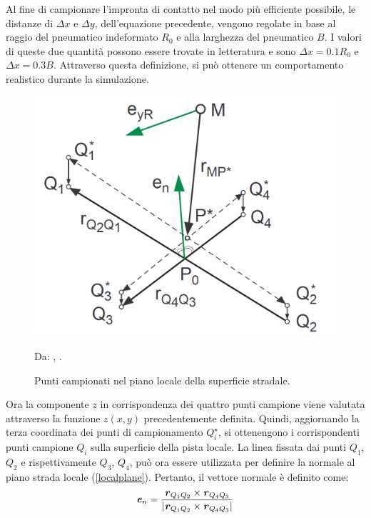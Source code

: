 %
Al fine di campionare l'impronta di contatto nel modo più efficiente possibile, le distanze di $\Delta x$ e $\Delta y$, dell'equazione precedente, vengono regolate in base al raggio del pneumatico indeformato $R_0$ e alla larghezza del pneumatico $B$. I valori di queste due quantità possono essere trovate in letteratura e sono $\Delta x = 0.1 R_0$ e $\Delta x = 0.3 B$. Attraverso questa definizione, si può ottenere un comportamento realistico durante la simulazione.

\begin{figure}[h]
	\centering
	\includegraphics[width=0.5\linewidth]{Figures/local_track}
	\caption{Punti campionati nel piano locale della superficie stradale.}
	Da: \citeauthor{Rill}, .
	\label{localtrack}
\end{figure}
%
\noindent
Ora la componente $z$ in corrispondenza dei quattro punti campione viene valutata attraverso la funzione $z(x,y)$ precedentemente definita. Quindi, aggiornando la terza coordinata dei punti di campionamento $Q^\star_i$, si ottenengono i corrispondenti punti campione $Q_i$ sulla superficie della pista locale. La linea fissata dai punti $Q_1$, $Q_2$ e rispettivamente $Q_3$, $Q_4$, può ora essere utilizzata per definire la normale al piano strada locale (\figurename \ref{localplane}). Pertanto, il vettore normale è definito come:
%
\begin{equation}
\textbf{\textit{e}}_n = \frac{\textbf{\textit{r}}_{Q_1 Q_2} \times \textbf{\textit{r}}_{Q_4 Q_3}}{|\textbf{\textit{r}}_{Q_1 Q_2} \times \textbf{\textit{r}}_{Q_4 Q_3}|}
\end{equation}

